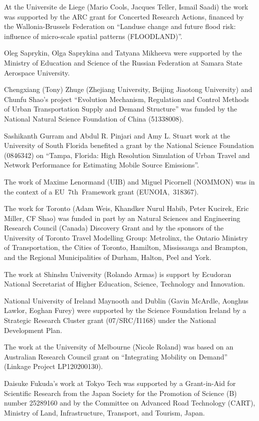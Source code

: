At the Universite de Liege (Mario Cools, Jacques Teller, Ismail Saadi) the work was supported by the ARC grant for Concerted Research Actions, financed by the Wallonia-Brussels Federation on ``Landuse change and future flood risk: influence of micro-scale spatial patterns (FLOODLAND)''.

Oleg Saprykin, Olga Saprykina and Tatyana Mikheeva were supported by the Ministry of Education and Science of the Russian Federation at Samara State Aerospace University. 

Chengxiang (Tony) Zhuge (Zhejiang University, Beijing Jiaotong University) and Chunfu Shao’s project ``Evolution Mechanism, Regulation and Control Methods of Urban Transportation Supply and Demand Structure'' was funded by the National Natural Science Foundation of China (51338008).

Sashikanth Gurram and Abdul R. Pinjari and Amy L. Stuart work at the University of South Florida benefited a grant by the National Science Foundation (0846342) on ``Tampa, Florida: High Resolution Simulation of Urban Travel and Network Performance for Estimating Mobile Source Emissions''.

The work of Maxime Lenormand (UIB) and Miguel Picornell (NOMMON) was in the context of a EU~7th~Framework grant (EUNOIA,~318367).
 
The work for Toronto (Adam Weis, Khandker Nurul Habib, Peter Kucirek, Eric Miller, CF Shao) was funded in part by an Natural Sciences and Engineering Research Council (Canada) Discovery Grant and by the sponsors of the University of Toronto Travel Modelling Group: Metrolinx, the Ontario Ministry of Transportation, the Cities of Toronto, Hamilton, Mississauga and Brampton, and the Regional Municipalities of Durham, Halton, Peel and York.

The work at Shinshu University (Rolando Armas) is support by Ecudoran National Secretariat of Higher Education, Science, Technology and Innovation. 

National University of Ireland Maynooth and Dublin (Gavin McArdle, Aonghus Lawlor, Eoghan Furey) were supported by the Science Foundation Ireland by a Strategic Research Cluster grant (07/SRC/I1168) under the National Development Plan.

The work at the University of Melbourne (Nicole Roland) was based on an Australian Research Council grant on ``Integrating Mobility on Demand'' (Linkage Project LP120200130).

Daisuke Fukuda's work at Tokyo Tech was supported by a Grant-in-Aid for Scientific Research from the Japan Society for the Promotion of Science (B) number 25289160 and by the Committee on Advanced Road Technology (CART), Ministry of Land, Infrastructure, Transport, and Tourism, Japan.

